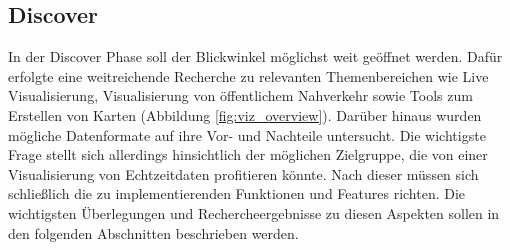 \begin{newpage}
  \section{Discover}
  \label{sec:discover}
    In der Discover Phase soll der Blickwinkel möglichst weit geöffnet werden.
    Dafür erfolgte eine weitreichende Recherche zu relevanten Themenbereichen wie Live Visualisierung, Visualisierung von öffentlichem Nahverkehr sowie Tools zum Erstellen von Karten (Abbildung \ref{fig:viz_overview}). Darüber hinaus wurden mögliche Datenformate auf ihre Vor- und Nachteile untersucht. Die wichtigste Frage stellt sich allerdings hinsichtlich der möglichen Zielgruppe, die von einer Visualisierung von Echtzeitdaten profitieren könnte. Nach dieser müssen sich schließlich die zu implementierenden Funktionen und Features richten. Die wichtigsten Überlegungen und Rechercheergebnisse zu diesen Aspekten sollen in den folgenden Abschnitten beschrieben werden.

    
    
    
    

\end{newpage}